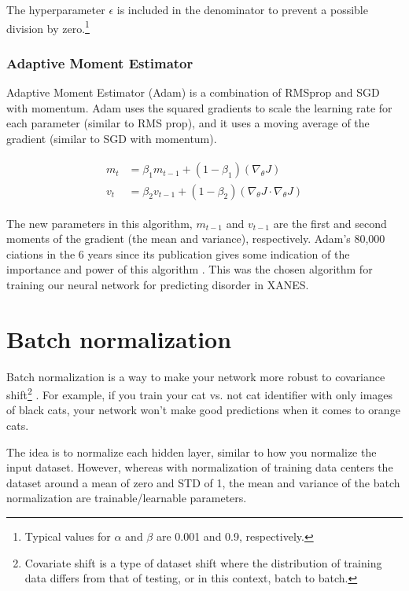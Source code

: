 \noindent The hyperparameter $ \epsilon $ is included in the denominator to prevent a possible division by zero.\footnote{Typical values for $ \alpha $  and $ \beta $  are 0.001 and 0.9, respectively.} 

\subsubsection{Adaptive Moment Estimator}
Adaptive Moment Estimator (Adam) is a combination of RMSprop and SGD with momentum. Adam uses the squared gradients to scale the learning rate for each parameter (similar to RMS prop), and it uses a moving average of the gradient (similar to SGD with momentum).

\begin{align} 
    \begin{split} 
    m_t &= \beta_1 m_{t-1} + (1 - \beta_1) (\nabla_\theta J) \\ 
    v_t &= \beta_2 v_{t-1} + (1 - \beta_2) (\nabla_\theta J \cdot \nabla_\theta J) 
    \end{split} 
\end{align}

\noindent The new parameters in this algorithm, $ m_{t-1} $ and $ v_{t-1} $ are the first and second moments of the gradient (the mean and variance), respectively. Adam's 80,000 ciations in the 6 years since its publication gives some indication of the importance and power of this algorithm \cite{orig-ADAM-paper}. This was the chosen algorithm for training our neural network for predicting disorder in XANES.

\section{Batch normalization}

Batch normalization is a way to make your network more robust to covariance shift\footnote{Covariate shift is a type of dataset shift where the distribution of training data differs from that of testing, or in this context, batch to batch.} \cite{batch-norm-orig}  \cite{batch-norm-conference}. For example, if you train your cat vs. not cat identifier with only images of black cats, your network won't make good predictions when it comes to orange cats.

The idea is to normalize each hidden layer, similar to how you normalize the input dataset. However, whereas with normalization of training data centers the dataset around a mean of zero and STD of 1, the mean and variance of the batch normalization are trainable/learnable parameters.

